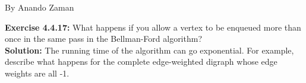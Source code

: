\documentclass[11pt,fleqn]{article}
\begin{document}
By Anando Zaman


\textbf{Exercise 4.4.17:} What happens if you allow a vertex to be enqueued more than once in the same
pass in the Bellman-Ford algorithm?\\

\textbf{Solution:} The running time of the algorithm can go exponential. For example, describe
what happens for the complete edge-weighted digraph whose edge weights are all -1.


	
\end{document}
